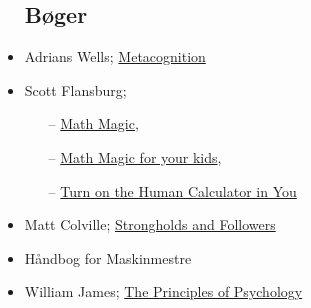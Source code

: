 \begin{itemize}
\subsection{Bøger}
    \item  Adrians Wells; \href{https://www.saxo.com/dk/metacognitive-therapy_peter-fisher_paperback_9780415434997}{Metacognition}
    \
    \item  Scott Flansburg;
        \begin{itemize}
            \item[--] \href{https://www.saxo.com/dk/math-magic-revised-edition_scott-flansburg-victoria-hay_paperback_9780060726355}{Math Magic},
            \item[--] \href{https://www.saxo.com/dk/math-magic-for-your-kids_scott-flansburg_paperback_9780060977313}{Math Magic for your kids},
            \item[--] \href{https://www.saxo.com/dk/turn-on-the-human-calculator-in-you_scott-flansburg_paperback_9780988408425}{Turn on the Human Calculator in You}
        \end{itemize}
    \item Matt Colville; \href{https://strongholds-and-streaming.backerkit.com/hosted_preorders/126471}{Strongholds and Followers}
    \item Håndbog for Maskinmestre
    \item William James; \href{https://www.saxo.com/dk/the-principles-of-psychology_william-james_paperback_9781515011767}{The Principles of Psychology}
\end{itemize}